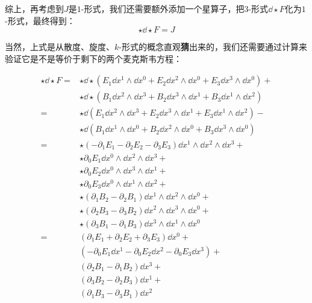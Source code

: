 综上，再考虑到$J$是$1$-形式，我们还需要额外添加一个星算子，把$3$-形式$\dd \star F$化为$1$-形式，最终得到：
\begin{equation}
    \star \dd \star F = J
\end{equation}

当然，上式是从散度、旋度、$k$-形式的概念直观\textbf{猜}出来的，我们还需要通过计算来验证它是不是等价于剩下的两个麦克斯韦方程：


\begin{equation}
    \begin{aligned}
        \star \dd \star F ={}& \star \dd \star (E_1\dd x^1\wedge \dd x^0 + E_2\dd x^2\wedge \dd x^0 + E_3\dd x^3\wedge \dd x^0)+\\
        & \star \dd \star (B_1\dd x^2\wedge \dd x^3+B_2\dd x^3\wedge \dd x^1 + B_3\dd x^1\wedge \dd x^2)\\
        ={}
        & \star \dd (E_1\dd x^2\wedge \dd x^3 + E_2\dd x^3\wedge \dd x^1 + E_3\dd x^1\wedge \dd x^2)-\\
        & \star \dd (B_1\dd x^1\wedge \dd x^0 + B_2\dd x^2\wedge \dd x^0 + B_3\dd x^3\wedge \dd x^0)\\
        ={}
        & \star (-\partial_1E_1-\partial_2E_2-\partial_3E_3)\dd x^1\wedge \dd x^2\wedge \dd x^3+\\
        & \star \partial_0E_1\dd x^0\wedge \dd x^2\wedge \dd x^3 +\\
        & \star \partial_0E_2\dd x^0\wedge \dd x^3\wedge \dd x^1 +\\
        & \star \partial_0E_3\dd x^0\wedge \dd x^1\wedge \dd x^2+\\
        & \star (\partial_1B_2-\partial_2B_1)\dd x^1\wedge \dd x^2 \wedge \dd x^0+\\
        & \star (\partial_2B_3-\partial_3B_2)\dd x^2\wedge \dd x^3 \wedge \dd x^0+\\
        & \star (\partial_3B_1-\partial_1B_3)\dd x^3\wedge \dd x^1 \wedge \dd x^0\\
        ={}
        & (\partial_1E_1+\partial_2E_2+\partial_3E_3)\dd x^0+\\
        & (-\partial_0 E_1\dd x^1-\partial_0 E_2\dd x^2-\partial_0 E_3\dd x^3)+\\
        & (\partial_2B_1-\partial_1B_2)\dd x^3+\\
        & (\partial_3B_2-\partial_2B_3)\dd x^1+\\
        & (\partial_1B_3-\partial_3B_1)\dd x^2
    \end{aligned}
\end{equation}

